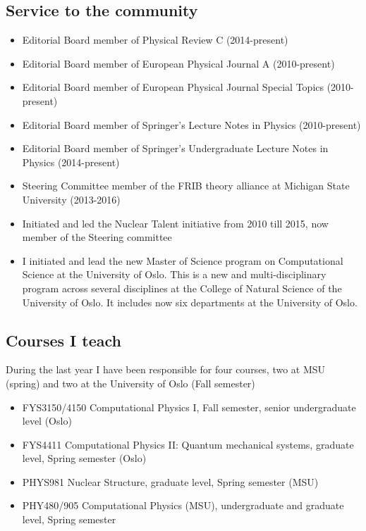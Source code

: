 \documentclass[prc,amsart,english,twocolumn,superscriptaddress,showpacs,floatfix]{revtex4}
\begin{document}
 \subsection*{Service to the community}
\begin{itemize}
\item Editorial Board member of Physical Review C (2014-present)

\item Editorial Board member of European Physical Journal A (2010-present)

\item Editorial Board member of European Physical Journal Special Topics (2010-present)

\item Editorial Board member of Springer's Lecture Notes in Physics (2010-present)

\item Editorial Board member of Springer's Undergraduate Lecture Notes in Physics (2014-present)

\item {Steering Committee member of the FRIB theory alliance at Michigan State University (2013-2016)}

\item {Initiated and led the Nuclear Talent initiative from 2010 till 2015, now member of the Steering committee}

\item I initiated and lead the new {Master of Science program on Computational Science at the University of Oslo}. This is a new and multi-disciplinary program across several disciplines at the College of Natural Science of the University of Oslo. It includes now six departments at the University of Oslo.
\end{itemize}

\subsection*{Courses I teach}
During the last year I have been responsible for four courses, two at MSU (spring) and two at the University of Oslo (Fall semester)
\begin{itemize}
\item {FYS3150/4150 Computational Physics I}, Fall semester, senior undergraduate level (Oslo) 

\item {FYS4411 Computational Physics II: Quantum mechanical systems}, graduate level, Spring semester (Oslo) 

\item {PHYS981 Nuclear Structure}, graduate level, Spring semester (MSU) 

\item {PHY480/905 Computational Physics} (MSU), undergraduate and graduate level, Spring semester
\end{itemize}
\end{document}
